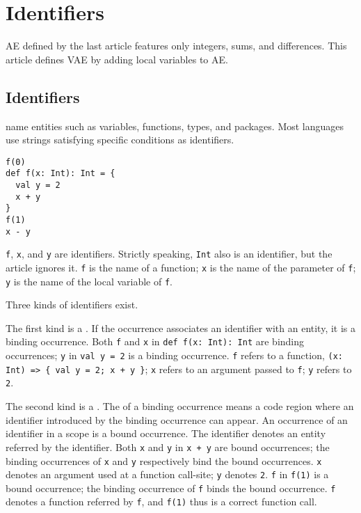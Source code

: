\setchapterpreamble[u]{\margintoc}
\chapter{Identifiers}

AE defined by the last article features only integers, sums, and differences.
This article defines VAE by adding local variables to AE.

\section{Identifiers}

 name entities such as variables, functions, types, and
packages. Most languages use strings satisfying specific conditions as
identifiers.

\begin{verbatim}
f(0)
def f(x: Int): Int = {
  val y = 2
  x + y
}
f(1)
x - y
\end{verbatim}

\verb!f!, \verb!x!, and \verb!y! are identifiers. Strictly speaking, \verb!Int!
also is an identifier, but the article ignores it. \verb!f! is the name of a
function; \verb!x! is the name of the parameter of \verb!f!; \verb!y! is the name
of the local variable of \verb!f!.

Three kinds of identifiers exist.

The first kind is a . If the occurrence associates an
identifier with an entity, it is a binding occurrence. Both \verb!f! and \verb!x!
in \verb!def f(x: Int): Int! are binding occurrences; \verb!y! in \verb!val y = 2!
is a binding occurrence. \verb!f! refers to a function, \verb!(x: Int) => { val y = 2; x + y }!;
\verb!x! refers to an argument passed to \verb!f!; \verb!y!
refers to \verb!2!.

The second kind is a . The  of a binding
occurrence means a code region where an identifier introduced by the binding
occurrence can appear. An occurrence of an identifier in a scope is a bound
occurrence. The identifier denotes an entity referred by the identifier. Both
\verb!x! and \verb!y! in \verb!x + y! are bound occurrences; the binding
occurrences of \verb!x! and \verb!y! respectively bind the bound occurrences.
\verb!x! denotes an argument used at a function call-site; \verb!y! denotes
\verb!2!. \verb!f! in \verb!f(1)! is a bound occurrence; the binding occurrence
of \verb!f! binds the bound occurrence. \verb!f! denotes a function referred by
\verb!f!, and \verb!f(1)! thus is a correct function call.

